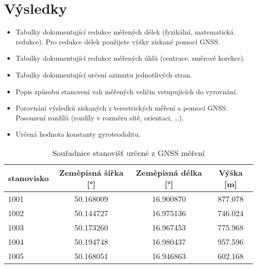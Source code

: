 \section{Výsledky}


\begin{itemize}
    \item Tabulky dokumentující redukce měřených délek (fyzikální, matematická redukce). 
          Pro redukce délek použijete výšky získané pomocí GNSS.
    \item Tabulky dokumentující redukce měřených úhlů (centrace, směrové korekce).
    \item Tabulky dokumentující určení azimutu jednotlivých stran.
    \item Popis způsobu stanovení vah měřených veličin vstupujících do vyrovnání.
    
    \item Porovnání výsledků získaných z terestrických měření a pomocí GNSS. 
          Posouzení rozdílů (rozdíly v rozměru sítě, orientaci, \ldots).
    
    \item Určená hodnota konstanty gyroteodolitu.
\end{itemize}



\begin{table}[h!]
\centering

\label{tab:gnss_coords}
\begin{tabular}{lccc}
\hline
stanovisko & Zeměpisná šířka [°] & Zeměpisná délka [°] & Výška [m] \\
\hline
1001 & 50.168009 & 16.900870 & 877.078 \\
1002 & 50.144727 & 16.975136 & 746.024 \\
1003 & 50.173260 & 16.967453 & 775.968 \\
1004 & 50.194748 & 16.980437 & 957.596 \\
1005 & 50.168051 & 16.946863 & 602.168 \\
\hline

\end{tabular}
\caption{Souřadnice stanovišť určené z GNSS měření}
\end{table}
